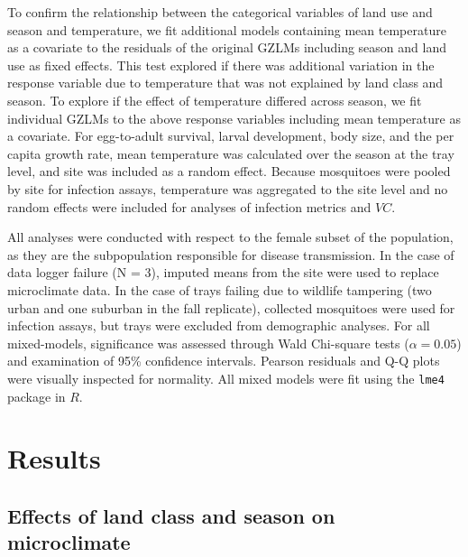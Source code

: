 \documentclass[12pt]{article}
\begin{document}
To confirm the relationship between the categorical variables of land use and season and temperature, we fit additional models containing mean temperature as a covariate to the residuals of the original GZLMs including season and land use as fixed effects.
This test explored if there was additional variation in the response variable due to temperature that was not explained by land class and season.
To explore if the effect of temperature differed across season, we fit individual GZLMs to the above response variables including mean temperature as a covariate.
For egg-to-adult survival, larval development, body size, and the per capita growth rate, mean temperature was calculated over the season at the tray level, and site was included as a random effect.
Because mosquitoes were pooled by site for infection assays, temperature was aggregated to the site level and no random effects were included for analyses of infection metrics and $VC$.

All analyses were conducted with respect to the female subset of the population, as they are the subpopulation responsible for disease transmission.
In the case of data logger failure (N = 3), imputed means from the site were used to replace microclimate data.
In the case of trays failing due to wildlife tampering (two urban and one suburban in the fall replicate), collected mosquitoes were used for infection assays, but trays were excluded from demographic analyses.
For all mixed-models, significance was assessed through Wald Chi-square tests ($\alpha=0.05$) and examination of 95\% confidence intervals.
Pearson residuals and Q-Q plots were visually inspected for normality.
All mixed models were fit using the \texttt{lme4} package in $R$.

\section*{Results}

\subsection*{Effects of land class and season on microclimate}
\end{document}
